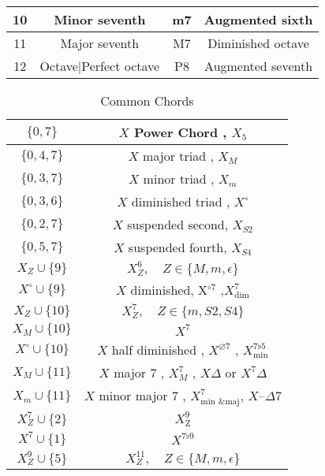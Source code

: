 \documentclass[pstricks]{amsart}
\begin{document}
\begin{table}[h]
\begin{tabular}{|c|c|c|c|}
    10                                                            & Minor seventh                  & m7                & Augmented sixth                \\ \hline
    11                                                            & Major seventh                  & M7                & Diminished octave              \\ \hline
    12                                                            & Octave|Perfect octave          & P8                & Augmented seventh              \\ \hline
  \end{tabular}
\end{table}


\begin{table}[]
\renewcommand{\arraystretch}{2}
\begin{tabular}{|c|c|}
\hline
 $\{0,7\}$ & $X$ Power Chord , $X_5$ \\ \hline
 $\{0,4,7\}$ & $X$ major triad , $X_M$ \\ \hline
 $\{0,3,7\}$ & $X$ minor triad , $X_m$ \\ \hline
 $\{0,3,6\}$ & $X$ diminished triad , $X^\circ$ \\ \hline
  $\{0,2,7\}$& $X$ suspended second, $X_{S2}$\\ \hline
  $\{0,5,7\}$& $X$ suspended fourth, $X_{S4}$\\ \hline
 $X_Z \cup \{9\}$ & $X^6_Z, \quad Z \in \{ M, m, \epsilon \}$  \\ \hline
 $X^\circ \cup \{9\}$ &  $X$ diminished, X$^{\circ 7}$ ,$X^{7}_{\text{dim}}$ \\ \hline
 $X_Z \cup \{10\}$ & $X^7_Z, \quad Z \in \{  m, S2, S4 \}$  \\ \hline
 $X_M \cup \{10\}$ & $X^7$ \\ \hline
 $X^\circ \cup \{10\}$ & $X$ half diminished      , $X^{\varnothing 7}$        , $X^{7\flat 5}_{\text{min}} $  \\ \hline
 $X_M \cup \{11\}$ & $X$ major 7              , $X_M^7$ , $X\Delta$ or $X^7\Delta$ \\ \hline
 $X_m \cup \{11\}$ & $X$ minor major 7        , $X_{\text{min \& maj}}^7$,     $X – \Delta7$    \\ \hline
 $X_Z^7 \cup \{2\}$ & $X^9_{\text{Z}}$ \\ \hline
 $X^7 \cup \{1\}$ & $X^{7\flat 9}$ \\ \hline
  $X^9_Z \cup \{5\}$&  $X^{11}_Z, \quad Z \in \{ M, m, \epsilon \}$ \\ \hline
\end{tabular}
\caption*{Common Chords}
\end{table}
\renewcommand{\arraystretch}{1}
\end{document}
